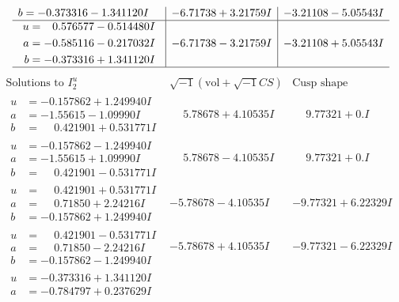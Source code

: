 \documentclass[1p]{elsarticle_modified}
\theoremstyle{definition}
\newcommand{\I}{\sqrt{-1}}
\begin{document}
$$\begin{array}{c|c|c}
\begin{aligned}
b &= -0.373316 - 1.341120 I\end{aligned}
 & -6.71738 + 3.21759 I & -3.21108 - 5.05543 I \\ \hline\begin{aligned}
u &= \phantom{-}0.576577 - 0.514480 I \\
a &= -0.585116 - 0.217032 I \\
b &= -0.373316 + 1.341120 I\end{aligned}
 & -6.71738 - 3.21759 I & -3.21108 + 5.05543 I\\
 \hline 
 \end{array}$$\newpage$$\begin{array}{c|c|c}  
\text{Solutions to }I^u_{2}& \I (\text{vol} + \sqrt{-1}CS) & \text{Cusp shape}\\
 \hline 
\begin{aligned}
u &= -0.157862 + 1.249940 I \\
a &= -1.55615 - 1.09990 I \\
b &= \phantom{-}0.421901 + 0.531771 I\end{aligned}
 & \phantom{-}5.78678 + 4.10535 I & \phantom{-}9.77321 + 0. I\phantom{ +0.000000I} \\ \hline\begin{aligned}
u &= -0.157862 - 1.249940 I \\
a &= -1.55615 + 1.09990 I \\
b &= \phantom{-}0.421901 - 0.531771 I\end{aligned}
 & \phantom{-}5.78678 - 4.10535 I & \phantom{-}9.77321 + 0. I\phantom{ +0.000000I} \\ \hline\begin{aligned}
u &= \phantom{-}0.421901 + 0.531771 I \\
a &= \phantom{-}0.71850 + 2.24216 I \\
b &= -0.157862 + 1.249940 I\end{aligned}
 & -5.78678 - 4.10535 I & -9.77321 + 6.22329 I \\ \hline\begin{aligned}
u &= \phantom{-}0.421901 - 0.531771 I \\
a &= \phantom{-}0.71850 - 2.24216 I \\
b &= -0.157862 - 1.249940 I\end{aligned}
 & -5.78678 + 4.10535 I & -9.77321 - 6.22329 I \\ \hline\begin{aligned}
u &= -0.373316 + 1.341120 I \\
a &= -0.784797 + 0.237629 I \\

\end{aligned}
\end{array}$$
\end{document}
